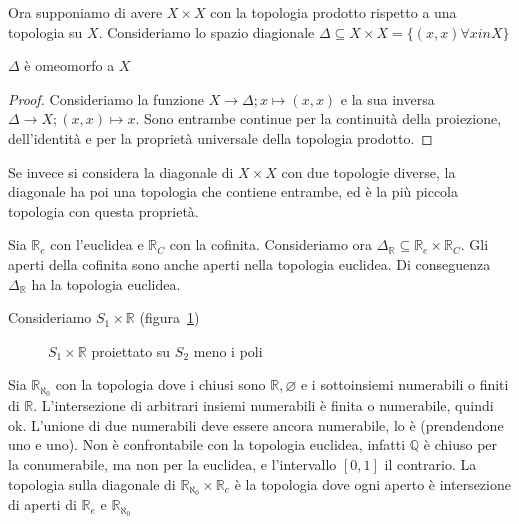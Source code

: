 Ora supponiamo di avere \(X\times X\) con la topologia prodotto rispetto a una
topologia su \(X\). Consideriamo lo spazio diagionale \(\Delta \subseteq X\times
X = \{(x, x) \forall x in X\} \) 
\begin{proposition}
    \(\Delta\) è omeomorfo a \(X\)
\end{proposition}
\begin{proof}
    Consideriamo la funzione \(X \to \Delta; x \mapsto (x, x)\) e la sua inversa
    \(\Delta \to X; (x, x) \mapsto x\). Sono entrambe continue per la continuità
    della proiezione, dell'identità e per la proprietà universale della
    topologia prodotto.
\end{proof}
Se invece si considera la diagonale di \(X\times X\) con due topologie diverse,
la diagonale ha poi una topologia che contiene entrambe, ed è la più piccola
topologia con questa proprietà.
\begin{example}
    Sia \(\mathbb{R}_e\) con l'euclidea e \(\mathbb{R}_C\) con la cofinita.
    Consideriamo ora \(\Delta_\mathbb{R}\subseteq \mathbb{R}_e \times \mathbb{R}_C \).
    Gli aperti della cofinita sono anche aperti nella topologia euclidea. Di
    conseguenza \(\Delta_ \mathbb{R}\) ha la topologia euclidea.
\end{example}
\begin{example}
    Consideriamo \(S_{1} \times \mathbb{R}\) (figura~\ref{fig:cilindro-infinito})
\end{example}
\begin{figure}[ht]
    \centering
    \caption{\(S_{1}\times \mathbb{R}\) proiettato su \(S_2\) meno i poli}
    \label{fig:cilindro-infinito}
\end{figure}
\begin{example}
Sia \(\mathbb{R}_{\aleph_0}\) con la topologia dove i chiusi sono \(\mathbb{R},
\varnothing\) e i sottoinsiemi numerabili o finiti di \(\mathbb{R}\). L'intersezione di
arbitrari insiemi numerabili è finita o numerabile, quindi ok. L'unione di due
numerabili deve essere ancora numerabile, lo è (prendendone uno e uno). Non è
confrontabile con la topologia euclidea, infatti \(\mathbb{Q}\) è chiuso per la
conumerabile, ma non per la euclidea, e l'intervallo \([0, 1]\) il contrario. La
topologia sulla diagonale di \(\mathbb{R}_{\aleph_0} \times \mathbb{R}_e\) è la
topologia dove ogni aperto è intersezione di aperti di \(\mathbb{R}_e\) e
\(\mathbb{R}_{\aleph_0}\) 
\end{example}



